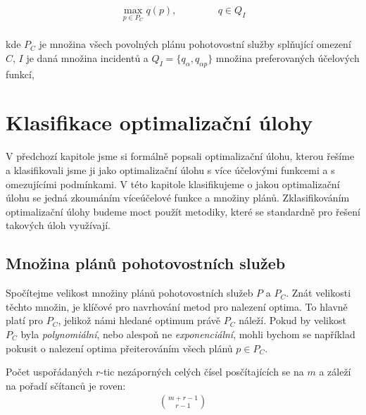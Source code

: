 \begin{definice}\label{df:optUloha1uc}
  \begin{align*}
    \max_{p \in P_C} q(p), \hspace{50pt} q \in Q_I
  \end{align*}
  \\
  kde $P_C$ je množina všech povolných plánu pohotovostní služby splňující omezení $C$, $I$ je daná množina incidentů
  a $Q_I = \{ q_{\alpha}, q_{\alpha p}\}$ množina preferovaných účelových funkcí,
\end{definice}

\section{Klasifikace optimalizační úlohy}

V předchozí kapitole jsme si formálně popsali optimalizační úlohu, kterou řešíme a klasifikovali jsme ji jako optimalizační úlohu s více účelovými funkcemi a s omezujícími podmínkami.
V této kapitole klasifikujeme o jakou optimalizační úlohu se jedná zkoumáním víceúčelové funkce a množiny plánů.
Zklasifikováním optimalizační úlohy budeme moct použít metodiky, které se standardně pro řešení takových úloh využívají. 

\subsection{Množina plánů pohotovostních služeb}

Spočítejme velikost množiny plánů pohotovostních služeb $P$ a $P_C$.
Znát velikosti těchto množin, je klíčové pro navrhování metod pro nalezení optima.
To hlavně platí pro $P_C$, jelikož námi hledané optimum právě $P_C$ náleží.
Pokud by velikost $P_C$ byla \textit{polynomiální}, nebo alespoň ne \textit{exponenciální},
mohli bychom se například pokusit o nalezení optima přeiterováním všech plánů $p \in P_C$.

\begin{lemma}\label{lemma:pocetRtic}
  Počet uspořádaných $r$-tic nezáporných celých čísel posčítajících se na $m$ a záleží na pořadí sčítanců je roven: 
  \begin{align*}
    \binom{m + r - 1}{r - 1}
  \end{align*}
  \\
\end{lemma}

